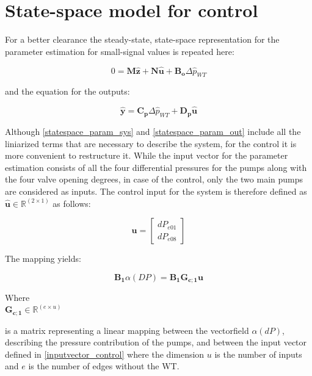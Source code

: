 \section{State-space model for control}
 \label{SystemLin_control}
 
 For a better clearance the steady-state, state-space representation for the parameter estimation for small-signal values is repeated here:
 
 \begin{equation}
 0 = \pmb{M} \pmb{\hat{z}} + \pmb{N} \pmb{\hat{u}} + \pmb{B_o} \Delta \hat{p}_{WT}    
 \label{statespace_param_sys}
\end{equation}

and the equation for the outputs:

\begin{equation}
  \pmb{\hat{y}} = \pmb{C_p} \Delta \hat{p}_{WT} + \pmb{D_p} \pmb{\hat{u}} 
   \label{statespace_param_out}
\end{equation}

Although \eqref{statespace_param_sys} and \eqref{statespace_param_out} include all the liniarized terms that are necessary to describe the system, for the control it is more convenient to restructure it. While the input vector for the parameter estimation consists of all the four differential pressures for the pumps along with the four valve opening degrees, in case of the control, only the two main pumps are considered as inputs. The control input for the system is therefore defined as $\pmb{\hat{u}} \in \pmb{\mathbb{R}}^{(2 \times 1)}$ as follows: 

\begin{equation}
\pmb{u} =
\begin{bmatrix} 
dP_{e01} \\
dP_{e08} 
\label{inputvector_control}
\end{bmatrix} 
\end{equation}

The mapping yields:

\begin{equation}
\pmb{B_1} \alpha(DP) = \pmb{B_1} \pmb{G_{c;1}} \pmb{u}
\label{mapping_main}
\end{equation}


\begin{minipage}[t]{0.20\textwidth}
Where\\
\hspace*{8mm} $\pmb{G_{c;1}} \in \pmb{\mathbb{R}}^{(e \times u)} $ 
\end{minipage}
\begin{minipage}[t]{0.68\textwidth}
\vspace*{2mm}
is a matrix representing a linear mapping between the vectorfield $\alpha(dP)$, describing the pressure contribution of the pumps, and between the input vector defined in \eqref{inputvector_control} where the dimension $u$ is the number of inputs and $e$ is the number of edges without the WT. 
\end{minipage} 

